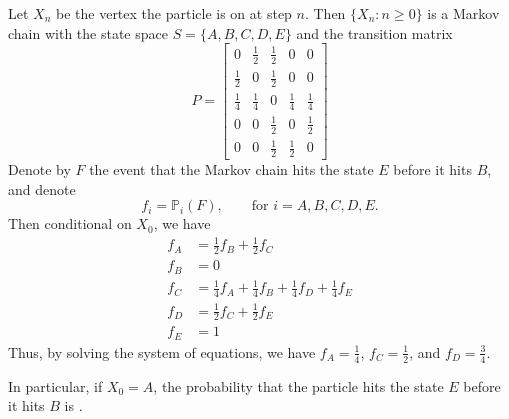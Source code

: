 \documentclass[
  coursecode={MTHE 455},
  assignmentname={Assignment \assignmentnumber},
  studentnumber=20053722,
  name={Bryan Hoang},
]{
  ltxanswer%
}
\begin{document}
  \begin{questions}
    \setcounter{question}{\questionnumber}
    \addtocounter{question}{-1}
    \question[5]{}
    \begin{solution}
      Let \(X_{n}\) be the vertex the particle is on at step \(n\). Then \(\{X_{n} : n \ge 0\}\) is a Markov chain with the state space \(S=\{A,B,C,D,E\}\) and the transition matrix
      \begin{equation*}
        P = \begin{bmatrix}
          0           & \frac{1}{2} & \frac{1}{2} & 0           & 0           \\
          \frac{1}{2} & 0           & \frac{1}{2} & 0           & 0           \\
          \frac{1}{4} & \frac{1}{4} & 0           & \frac{1}{4} & \frac{1}{4} \\
          0           & 0           & \frac{1}{2} & 0           & \frac{1}{2} \\
          0           & 0           & \frac{1}{2} & \frac{1}{2} & 0
        \end{bmatrix}
      \end{equation*}
      Denote by \(F\) the event that the Markov chain hits the state \(E\) before it hits \(B\), and denote
      \begin{equation*}
        f_{i} = \mathbb{P}_{i}(F), \qquad \text{for } i = A, B, C, D, E.
      \end{equation*}
      Then conditional on \(X_{0}\), we have
      \begin{align*}
        f_{A} &= \frac{1}{2}f_{B} + \frac{1}{2}f_{C}                                       \\
        f_{B} &= 0                                                                         \\
        f_{C} &= \frac{1}{4}f_{A} + \frac{1}{4}f_{B} + \frac{1}{4}f_{D} + \frac{1}{4}f_{E} \\
        f_{D} &= \frac{1}{2}f_{C} + \frac{1}{2}f_{E}                                       \\
        f_{E} &= 1
      \end{align*}
      Thus, by solving the system of equations, we have \(f_{A}=\frac{1}{4}\), \(f_{C}=\frac{1}{2}\), and \(f_{D}=\frac{3}{4}\).

      In particular, if \(X_{0}=A\), the probability that the particle hits the state \(E\) before it hits \(B\) is .
    \end{solution}
  \end{questions}
\end{document}
